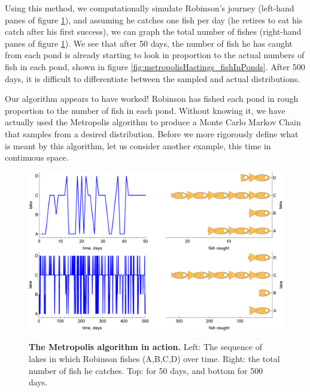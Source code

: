 \documentclass[11pt,fullpage]{book}
\begin{document}
Using this method, we computationally simulate Robinson's journey (left-hand panes of figure \ref{fig:metropolisHastings_MetropolisFish}), and assuming he catches one fish per day (he retires to eat his catch after his first success), we can graph the total number of fishes (right-hand panes of figure \ref{fig:metropolisHastings_MetropolisFish}). We see that after 50 days, the number of fish he has caught from each pond is already starting to look in proportion to the actual numbers of fish in each pond, shown in figure \ref{fig:metropolisHastings_fishInPonds}. After 500 days, it is difficult to differentiate between the sampled and actual distributions. 

Our algorithm appears to have worked! Robinson has fished each pond in rough proportion to the number of fish in each pond. Without knowing it, we have actually used the Metropolis algorithm to produce a Monte Carlo Markov Chain that samples from a desired distribution. Before we more rigorously define what is meant by this algorithm, let us consider another example, this time in continuous space.

\begin{figure}
\centering
\scalebox{0.4} 
{\includegraphics{metropolisHastings_metropolisFish.pdf}}
\caption{\textbf{The Metropolis algorithm in action.} Left: The sequence of lakes in which Robinson fishes (A,B,C,D) over time. Right: the total number of fish he catches. Top: for 50 days, and bottom for 500 days.}\label{fig:metropolisHastings_MetropolisFish}
\end{figure}
\end{document}
